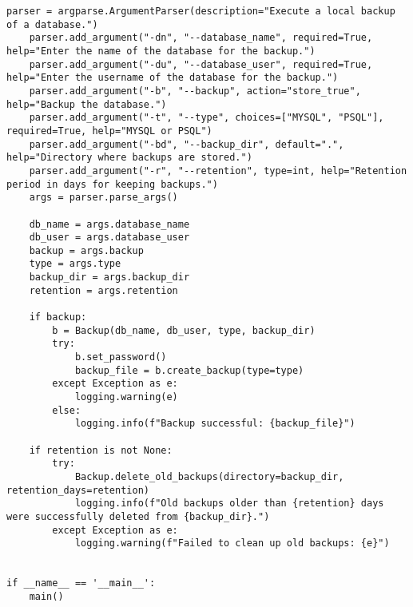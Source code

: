 \begin{lstlisting}[language=script, caption={Python-script voor back-ups en retentiebeleid.}]
    parser = argparse.ArgumentParser(description="Execute a local backup of a database.")
    parser.add_argument("-dn", "--database_name", required=True, help="Enter the name of the database for the backup.")
    parser.add_argument("-du", "--database_user", required=True, help="Enter the username of the database for the backup.")
    parser.add_argument("-b", "--backup", action="store_true", help="Backup the database.")
    parser.add_argument("-t", "--type", choices=["MYSQL", "PSQL"], required=True, help="MYSQL or PSQL")
    parser.add_argument("-bd", "--backup_dir", default=".", help="Directory where backups are stored.")
    parser.add_argument("-r", "--retention", type=int, help="Retention period in days for keeping backups.")
    args = parser.parse_args()

    db_name = args.database_name
    db_user = args.database_user
    backup = args.backup
    type = args.type
    backup_dir = args.backup_dir
    retention = args.retention

    if backup:
        b = Backup(db_name, db_user, type, backup_dir)
        try:
            b.set_password()
            backup_file = b.create_backup(type=type)
        except Exception as e:
            logging.warning(e)
        else:
            logging.info(f"Backup successful: {backup_file}")

    if retention is not None:
        try:
            Backup.delete_old_backups(directory=backup_dir, retention_days=retention)
            logging.info(f"Old backups older than {retention} days were successfully deleted from {backup_dir}.")
        except Exception as e:
            logging.warning(f"Failed to clean up old backups: {e}")


if __name__ == '__main__':
    main()
\end{lstlisting}
